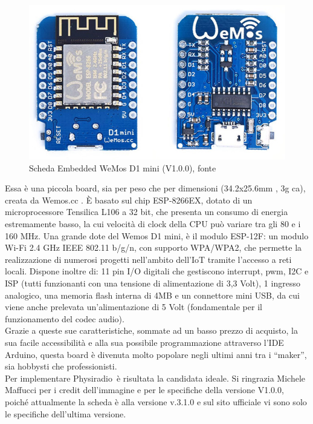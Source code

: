 \documentclass[12pt,a4paper]{report}
\newcommand{\physiradio}{Physiradio} %
\begin{document}
\begin{figure}[h]
	\begin{center}
		\centerline{\includegraphics[scale=0.35]{Immagini/Wemos_Lolin_D1_mini_v1.jpg}}
		\caption{Scheda Embedded WeMos D1 mini (V1.0.0), fonte \cite{micheleMaffucciWemosV1}}
		\label{fig:wemosD1mini}
	\end{center}
\end{figure}

Essa è una piccola board, sia per peso che per dimensioni (34.2x25.6mm , 3g ca), creata da Wemos.cc \cite{wemosd1_mini}. 
È basato sul chip ESP-8266EX, dotato di un microprocessore Tensilica L106 a 32 bit, che presenta un consumo di energia estremamente basso, la cui velocità di clock della CPU può variare tra gli 80 e i 160 MHz.
Una grande dote del Wemos D1 mini, è il modulo ESP-12F: un modulo Wi-Fi 2.4 GHz IEEE 802.11 b/g/n, con supporto WPA/WPA2, che permette la realizzazione di numerosi progetti nell'ambito dell'IoT tramite l'accesso a reti locali.
Dispone inoltre di: 11 pin I/O digitali che gestiscono interrupt, pwm, I2C e ISP (tutti funzionanti con una tensione di alimentazione di 3,3 Volt), 1 ingresso analogico, una memoria flash interna di 4MB e un connettore mini USB, da cui viene anche prelevata un'alimentazione di 5 Volt (fondamentale per il funzionamento del codec audio).\\
Grazie a queste sue caratteristiche, sommate ad un basso prezzo di acquisto, la sua facile accessibilità e alla sua possibile programmazione attraverso l'IDE Arduino\cite{arduino}, questa board è divenuta molto popolare negli ultimi anni tra i ``maker'', sia hobbysti che professionisti.\\
Per implementare \physiradio\ è risultata la candidata ideale.
Si ringrazia Michele Maffucci \cite{micheleMaffucciWemosV1} per i credit dell'immagine e per le specifiche della versione V1.0.0, poiché attualmente la scheda è alla versione v.3.1.0 e sul sito ufficiale vi sono solo le specifiche dell'ultima versione. 
\end{document}
